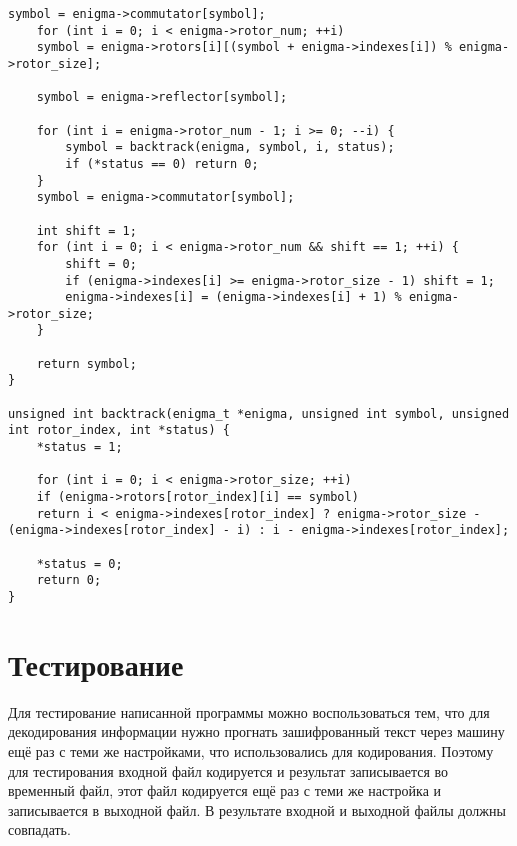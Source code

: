 \begin{center}
\begin{lstlisting}[label=lst:enigma1,caption=Реализация алгоритма шифрования машины <<Энигма>>]
	symbol = enigma->commutator[symbol];
	for (int i = 0; i < enigma->rotor_num; ++i)
	symbol = enigma->rotors[i][(symbol + enigma->indexes[i]) % enigma->rotor_size];
	
	symbol = enigma->reflector[symbol];
	
	for (int i = enigma->rotor_num - 1; i >= 0; --i) {
		symbol = backtrack(enigma, symbol, i, status);
		if (*status == 0) return 0;
	}
	symbol = enigma->commutator[symbol];
	
	int shift = 1;
	for (int i = 0; i < enigma->rotor_num && shift == 1; ++i) {
		shift = 0;
		if (enigma->indexes[i] >= enigma->rotor_size - 1) shift = 1;
		enigma->indexes[i] = (enigma->indexes[i] + 1) % enigma->rotor_size;
	}
	
	return symbol;
}

unsigned int backtrack(enigma_t *enigma, unsigned int symbol, unsigned int rotor_index, int *status) {
	*status = 1;
	
	for (int i = 0; i < enigma->rotor_size; ++i)
	if (enigma->rotors[rotor_index][i] == symbol)
	return i < enigma->indexes[rotor_index] ? enigma->rotor_size - (enigma->indexes[rotor_index] - i) : i - enigma->indexes[rotor_index];
	
	*status = 0;
	return 0;
}

\end{lstlisting}
\end{center}
\FloatBarrier

\section{Тестирование}

Для тестирование написанной программы можно воспользоваться тем, что для декодирования информации нужно прогнать зашифрованный текст через машину ещё раз с теми же настройками, что использовались для кодирования. Поэтому для тестирования входной файл кодируется и результат записывается во временный файл, этот файл кодируется ещё раз с теми же настройка и записывается в выходной файл. В результате входной и выходной файлы должны совпадать.

